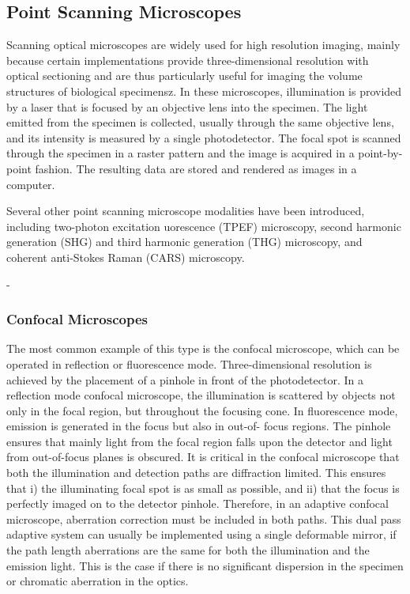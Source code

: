 \cite{wide_MPFM}


\subsection{Point Scanning Microscopes}
\label{sec:PointScanningMicroscopes}

Scanning optical microscopes are widely used for high resolution imaging, 
mainly because certain implementations provide three-dimensional resolution 
with optical sectioning and are thus particularly useful for imaging the 
volume structures of biological specimensz. In these microscopes, 
illumination is provided by a laser that is focused by an objective lens into 
the specimen. The light emitted from the specimen is collected, usually 
through the same objective lens, and its intensity is measured by a single 
photodetector. The focal spot is scanned through the specimen in a raster 
pattern and the image is acquired in a point-by-point fashion. The resulting 
data are stored and rendered as images in a computer.

Several other point scanning microscope modalities have been introduced, 
including two-photon excitation uorescence (TPEF) microscopy, second harmonic 
generation (SHG) and third harmonic generation (THG) microscopy, and coherent 
anti-Stokes Raman (CARS) microscopy.

-
\subsubsection{Confocal Microscopes}
\label{sec:ConfocalMicroscopes}

The most common example of this type is the confocal microscope, which can be 
operated in reflection or fluorescence mode. Three-dimensional resolution is 
achieved by the placement of a pinhole in front of the photodetector. In a 
reflection mode confocal microscope, the illumination is scattered by objects 
not only in the focal region, but throughout the focusing cone. In 
fluorescence mode, emission is generated in the focus but also in out-of-
focus regions. The pinhole ensures that mainly light from the focal region 
falls upon the detector and light from out-of-focus planes is obscured. It is 
critical in the confocal microscope that both the illumination and detection 
paths are diffraction limited. This ensures that i) the illuminating focal 
spot is as small as possible, and ii) that the focus is perfectly imaged on 
to the detector pinhole. Therefore, in an adaptive confocal microscope, 
aberration correction must be included in both paths. This dual pass adaptive 
system can usually be implemented using a single deformable mirror, if the 
path length aberrations are the same for both the illumination and the 
emission light. This is the case if there is no significant dispersion in the 
specimen or chromatic aberration in the optics.

